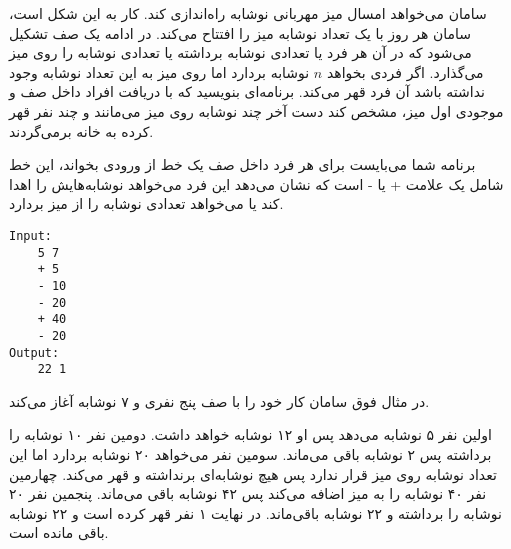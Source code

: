 \documentclass[../main.tex]{subfiles}
\begin{document}

سامان می‌خواهد امسال میز مهربانی نوشابه راه‌اندازی کند. کار به این شکل است، سامان هر روز با یک تعداد نوشابه میز را افتتاح می‌کند.
در ادامه یک صف تشکیل می‌شود که در آن هر فرد یا تعدادی نوشابه برداشته یا تعدادی نوشابه را روی میز می‌گذارد.
اگر فردی بخواهد $n$ نوشابه بردارد اما روی میز به این تعداد نوشابه وجود نداشته باشد آن فرد قهر می‌کند.
برنامه‌ای بنویسید که با دریافت افراد داخل صف و موجودی اول میز، مشخص کند دست آخر چند نوشابه روی میز می‌مانند و چند نفر قهر کرده به خانه برمی‌گردند.

برنامه شما می‌بایست برای هر فرد داخل صف یک خط از ورودی بخواند، این خط شامل یک علامت + یا -‌ است که نشان می‌دهد این فرد می‌خواهد نوشابه‌هایش را اهدا کند یا می‌خواهد تعدادی نوشابه را از میز بردارد.

\begin{latin}
\begin{verbatim}
Input:
    5 7
    + 5
    - 10
    - 20
    + 40
    - 20
Output:
    22 1
\end{verbatim}
\end{latin}

در مثال فوق سامان کار خود را با صف پنج نفری و ۷ نوشابه آغاز می‌کند.

 اولین نفر ۵ نوشابه می‌دهد پس او ۱۲ نوشابه خواهد داشت.
 دومین نفر ۱۰ نوشابه را برداشته پس ۲ نوشابه باقی می‌ماند.
 سومین نفر می‌خواهد ۲۰ نوشابه بردارد اما این تعداد نوشابه روی میز قرار ندارد پس هیچ نوشابه‌ای برنداشته و قهر می‌کند.
 چهارمین نفر ۴۰ نوشابه را به میز اضافه می‌کند پس ۴۲ نوشابه باقی می‌ماند.
 پنجمین نفر ۲۰ نوشابه را برداشته و ۲۲ نوشابه باقی‌ماند. در نهایت ۱ نفر قهر کرده است و ۲۲ نوشابه باقی مانده است.
\end{document}
